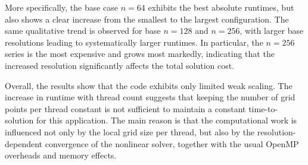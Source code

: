 \documentclass[unicode,10pt,a4paper,oneside,numbers=endperiod,openany]{scrartcl}
\begin{document}
More specifically, the base case \(n=64\) exhibits the best absolute runtimes, but also shows a clear increase from the smallest to the largest configuration. The same qualitative trend is observed for base \(n=128\) and \(n=256\), with larger base resolutions leading to systematically larger runtimes. In particular, the \(n=256\) series is the most expensive and grows most markedly, indicating that the increased resolution significantly affects the total solution cost.

Overall, the results show that the code exhibits only limited weak scaling. The increase in runtime with thread count suggests that keeping the number of grid points per thread constant is not sufficient to maintain a constant time-to-solution for this application. The main reason is that the computational work is influenced not only by the local grid size per thread, but also by the resolution-dependent convergence of the nonlinear solver, together with the usual OpenMP overheads and memory effects.
\end{document}
